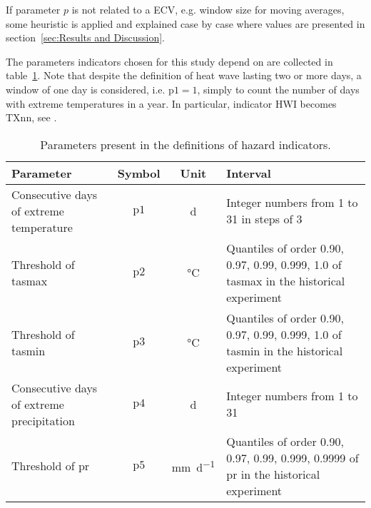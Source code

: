 If parameter $p$ is not related to a \gls{ECV}, e.g. window size for moving averages, some heuristic is applied and explained case by case where values are presented in section~\ref{sec:Results and Discussion}.

The parameters indicators chosen for this study depend on are collected in table~\ref{tab:indicators_parameters}. Note that despite the definition of heat wave lasting two or more days, a window of one day is considered, i.e. $\mathrm{p1} = 1$, simply to count the number of days with extreme temperatures in a year. In particular, indicator $\mathrm{HWI}$ becomes $\mathrm{TXnn}$, see \cite[2209]{2021GutierrezAnnexVI}.

\begin{table}[h]
  \renewcommand*{\arraystretch}{1.5}
  \centering
  \caption{Parameters present in the definitions of hazard indicators.}
  \label{tab:indicators_parameters}
  \begin{tabular}{p{}ccp{}}
    Parameter                                 & Symbol        & Unit                        & Interval                                                                                     \\
    \hline
    Consecutive days of extreme temperature   & $\mathrm{p1}$ & \unit{\day}                 & Integer numbers from 1 to 31 in steps of 3                                                   \\  %
    Threshold of \gls{tasmax}                 & $\mathrm{p2}$ & \unit{\degreeCelsius}       & Quantiles of order 0.90, 0.97, 0.99, 0.999, 1.0 of \gls{tasmax} in the historical experiment \\
    Threshold of \gls{tasmin}                 & $\mathrm{p3}$ & \unit{\degreeCelsius}       & Quantiles of order 0.90, 0.97, 0.99, 0.999, 1.0 of \gls{tasmin} in the historical experiment \\
    Consecutive days of extreme precipitation & $\mathrm{p4}$ & \unit{\day}                 & Integer numbers from 1 to 31                                                                 \\  %
    Threshold of \gls{pr}                     & $\mathrm{p5}$ & \unit{\milli\metre\per\day} & Quantiles of order 0.90, 0.97, 0.99, 0.999, 0.9999 of \gls{pr} in the historical experiment  \\
  \end{tabular}
\end{table}


